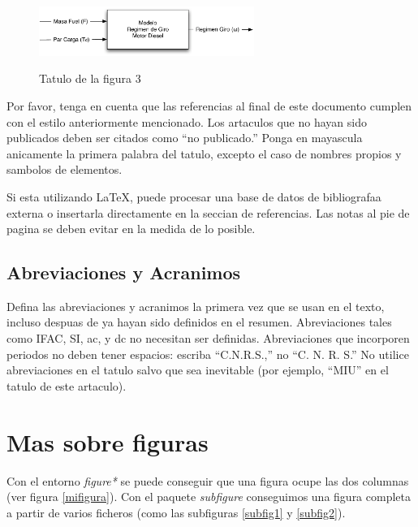 \documentclass[5p,times,authoryear]{elsarticle}
\begin{document}
\begin{figure}
\centering
  \includegraphics[width=7cm]{figurapdf}\\
  \caption{Tatulo de la figura 3}\label{fig3}
\end{figure}

Por favor, tenga en cuenta que las referencias al final de este
documento cumplen con el estilo anteriormente mencionado. Los
artaculos que no hayan sido publicados deben ser citados como ``no
publicado.'' Ponga en mayascula anicamente la primera palabra del
tatulo, excepto el caso de nombres propios y sambolos de elementos.

Si esta utilizando LaTeX, puede procesar una base de datos de bibliografaa externa o insertarla directamente en la seccian de referencias.
Las notas al pie de pagina se deben evitar en la medida de lo posible.

\subsection{Abreviaciones y Acranimos}

Defina las abreviaciones y acranimos la primera vez que se usan en
el texto, incluso despuas de ya hayan sido definidos en el resumen.
Abreviaciones tales como IFAC, SI, ac, y dc no necesitan ser
definidas. Abreviaciones que incorporen periodos no deben tener
espacios: escriba ``C.N.R.S.,'' no ``C. N. R. S.'' No utilice
abreviaciones en el tatulo salvo que sea inevitable (por ejemplo,
``MIU'' en el tatulo de este artaculo).

\section{Mas sobre figuras}

Con el entorno \emph{figure*} se puede conseguir que una figura ocupe las dos columnas (ver figura \ref{mifigura}). Con el paquete \emph{subfigure} conseguimos una figura completa a partir de varios ficheros (como las subfiguras \ref{subfig1} y \ref{subfig2}).
\end{document}

